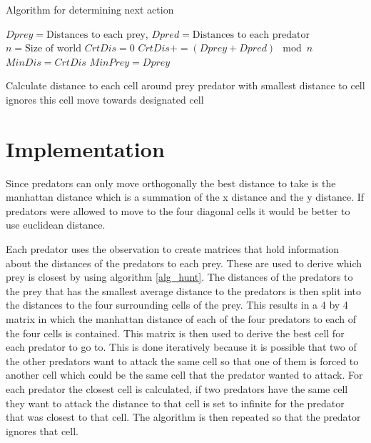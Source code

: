 \documentclass[10pt]{article}
\begin{document}
\begin{algorithm}
\caption{Algorithm for determining next action}
\label{alg_hunt}
	\begin{algorithmic}
\REQUIRE $Dprey=\textrm{Distances to each prey}$, $Dpred=\textrm{Distances to each predator}$
\STATE $n=\textrm{Size of world}$
\STATE {}
\STATE $CrtDis=0$
\STATE $CrtDis += (Dprey+Dpred)\mod n$
\ENDFOR
{}
\STATE $MinDis=CrtDis$
\STATE $MinPrey = Dprey$
\ENDIF
\ENDFOR

\STATE {}
\STATE Calculate distance to each cell around prey
\STATE predator with smallest distance to cell ignores this cell
\ENDIF
\ENDFOR
\STATE move towards designated cell
\end{algorithmic}
\end{algorithm}


\section{Implementation}\label{implementation}
Since predators can only move orthogonally the best distance to take is the manhattan distance which is a summation of the x distance and the y distance. If predators were allowed to move to the four diagonal cells it would be better to use euclidean distance. 

Each predator uses the observation to create matrices that hold information about the distances of the predators to each prey. These are used to derive which prey is closest by using algorithm \ref{alg_hunt}. The distances of the predators to the prey that has the smallest average distance to the predators is then split into the distances to the four surrounding cells of the prey. This results in a 4 by 4 matrix in which the manhattan distance of each of the four predators to each of the four cells is contained. This matrix is then used to derive the best cell for each predator to go to. This is done iteratively because it is possible that two of the other predators want to attack the same cell so that one of them is forced to another cell which could be the same cell that the predator wanted to attack. For each predator the closest cell is calculated, if two predators have the same cell they want to attack the distance to that cell is set to infinite for the predator that was closest to that cell. The algorithm is then repeated so that the predator ignores that cell.
\end{document}
